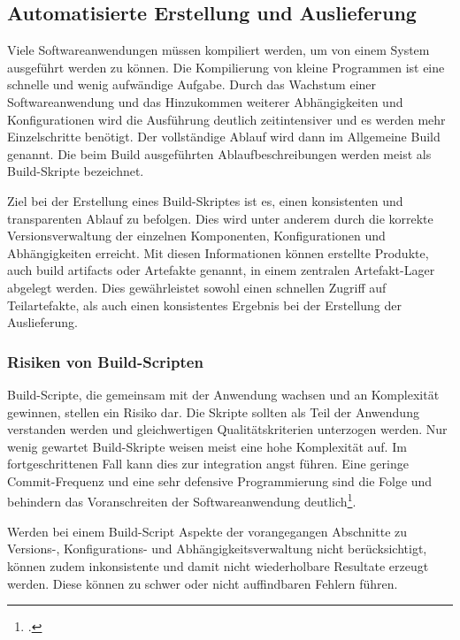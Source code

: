 \subsection{Automatisierte Erstellung und Auslieferung}

Viele Softwareanwendungen müssen kompiliert werden, um von einem System ausgeführt werden zu können. Die Kompilierung von kleine Programmen ist eine schnelle und wenig aufwändige Aufgabe. Durch das Wachstum einer Softwareanwendung und das Hinzukommen weiterer Abhängigkeiten und Konfigurationen wird die Ausführung deutlich zeitintensiver und es werden mehr Einzelschritte benötigt. Der vollständige Ablauf wird dann im Allgemeine Build genannt. Die beim Build ausgeführten Ablaufbeschreibungen werden meist als Build-Skripte bezeichnet. 

Ziel bei der Erstellung eines Build-Skriptes ist es, einen konsistenten und transparenten Ablauf zu 
befolgen. Dies wird unter anderem durch die korrekte Versionsverwaltung der einzelnen Komponenten, Konfigurationen und 
Abhängigkeiten erreicht. Mit diesen Informationen können erstellte Produkte, auch \glqq build artifacts\grqq{} oder Artefakte
genannt, in einem zentralen Artefakt-Lager abgelegt werden. Dies gewährleistet sowohl einen schnellen Zugriff auf 
Teilartefakte, als auch einen konsistentes Ergebnis bei der Erstellung der Auslieferung.

\subsubsection{Risiken von Build-Scripten}

Build-Scripte, die gemeinsam mit der Anwendung wachsen und an Komplexität gewinnen, stellen ein Risiko dar. Die Skripte sollten als Teil der Anwendung verstanden werden und gleichwertigen Qualitätskriterien unterzogen werden. Nur wenig gewartet Build-Skripte weisen meist eine hohe Komplexität auf. Im fortgeschrittenen Fall kann dies zur  \glqq integration angst\grqq{} führen. Eine geringe Commit-Frequenz und eine sehr defensive Programmierung sind die Folge und behindern das Voranschreiten der Softwareanwendung deutlich\footcite[vgl.][]{ci-is-not-build-systems}.

Werden bei einem Build-Script Aspekte der vorangegangen Abschnitte zu Versions-, Konfigurations- und Abhängigkeitsverwaltung nicht berücksichtigt, können zudem inkonsistente und damit nicht 
wiederholbare Resultate erzeugt werden. Diese können zu schwer oder nicht auffindbaren Fehlern führen.


